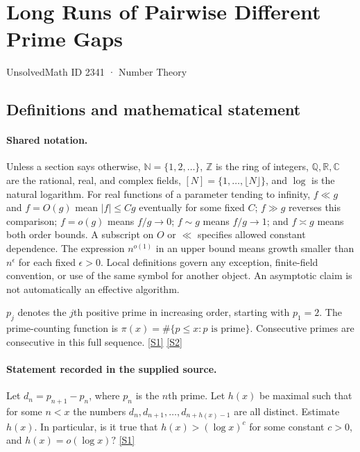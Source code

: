 \documentclass[11pt,a4paper]{article}
\newcommand{\N}{\mathbb{N}}
\newcommand{\Z}{\mathbb{Z}}
\newcommand{\Q}{\mathbb{Q}}
\newcommand{\R}{\mathbb{R}}
\newcommand{\C}{\mathbb{C}}
\newcommand{\sref}[2]{\hyperlink{source:#1:#2}{[S#2]}}
\begin{document}

\setcounter{section}{2340}

\section{Long Runs of Pairwise Different Prime Gaps}\label{2341}

{\small\sffamily UnsolvedMath ID 2341 · Number Theory}

\subsection{Definitions and mathematical statement}

\paragraph{Shared notation.}Unless a section says otherwise, $\N=\{1,2,\ldots\}$,
$\Z$ is the ring of integers, $\Q,\R,\C$ are the rational, real, and complex
fields, $[N]=\{1,\ldots,\lfloor N\rfloor\}$, and $\log$ is the natural
logarithm. For real functions of a parameter tending to infinity,
$f\ll g$ and $f=O(g)$ mean $|f|\leq Cg$ eventually for some fixed $C$;
$f\gg g$ reverses this comparison; $f=o(g)$ means $f/g\to0$;
$f\sim g$ means $f/g\to1$; and $f\asymp g$ means both order bounds.
A subscript on $O$ or $\ll$ specifies allowed constant dependence.
The expression $n^{o(1)}$ in an upper bound means growth smaller than
$n^\epsilon$ for each fixed $\epsilon>0$. Local definitions govern any
exception, finite-field convention, or use of the same symbol for another
object. An asymptotic claim is not automatically an effective algorithm.



$p_j$ denotes the $j$th positive prime in increasing order, starting with $p_1=2$. The prime-counting function is $\pi(x)=\#\{p\leq x:p\text{ is prime}\}$. Consecutive primes are consecutive in this full sequence. \sref{2341}{1} \sref{2341}{2}

\paragraph{Statement recorded in the supplied source.}
Let $d_n=p_{n+1}-p_n$, where $p_n$ is the $n$th prime. Let $h(x)$ be maximal such that for some $n<x$ the numbers $d_n,d_{n+1},\ldots,d_{n+h(x)-1}$ are all distinct. Estimate $h(x)$. In particular, is it true that $ h(x) >(\log x)^c $ for some constant $c>0$, and $ h(x)=o(\log x)? $ \sref{2341}{1}
\end{document}
